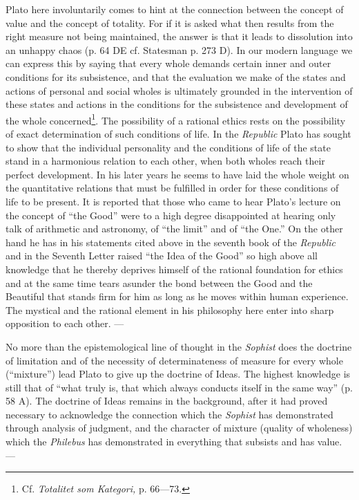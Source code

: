 \documentclass[12pt,a4paper,openany]{book}
\newcommand{\opage}[1]{\marginnote{\footnotesize\textit{[#1]}}}
\begin{document}
Plato here involuntarily comes to hint at the connection
between the concept of value and the concept of totality.  For
if it is asked what then results from the right measure
not being maintained, the answer is that it leads to dissolution into an
unhappy chaos (p. 64 DE cf. Statesman p. 273 D).  In our
modern language we can express this by saying that every whole
demands certain inner and outer conditions for its subsistence,
and that the evaluation we make of the states and actions of personal and
social wholes is ultimately grounded
in the intervention of these states and actions in
the conditions for the subsistence and development of the whole concerned\footnote[1]{Cf. \textit{Totalitet som Kategori,} p. 66---73.}.
The possibility of a rational ethics rests on the possibility
of exact determination of such conditions of life.
In the \textit{Republic} Plato has sought to show that the individual personality
and the conditions of life of the state stand in a harmonious relation
to each other, when both wholes reach their perfect
development.  In his later years he seems to have laid the whole
\setcounter{footnote}{0}%
\opage{61}weight on the quantitative relations that must be fulfilled
in order for these conditions of life to be present.  It is reported
that those who came to hear Plato's lecture on the concept of
``the Good'' were to a high degree disappointed at hearing only
talk of arithmetic and astronomy, of ``the limit'' and of ``the
One.''  On the other hand he has in his statements cited above
in the seventh book of the \textit{Republic} and in the Seventh Letter
raised ``the Idea of the Good'' so high above all knowledge that
he thereby deprives himself of the rational foundation for ethics and
at the same time tears asunder the bond between the Good and the
Beautiful that stands firm for him as long as he moves within
human experience.  The mystical and the rational
element in his philosophy here enter into sharp opposition to
each other. ---

No more than the epistemological line of thought in
the \textit{Sophist} does the doctrine of limitation and of the necessity
of determinateness of measure for every whole (``mixture'')
lead Plato to give up the doctrine of Ideas.  The highest knowledge is still
that of ``what truly is, that which always conducts
itself in the same way'' (p. 58 A).  The doctrine of Ideas remains in the background,
after it had proved necessary to acknowledge
the connection which the \textit{Sophist} has demonstrated through analysis
of judgment, and the character of mixture (quality of wholeness)
which the \textit{Philebus} has demonstrated in everything that subsists and has value. ---
\end{document}
